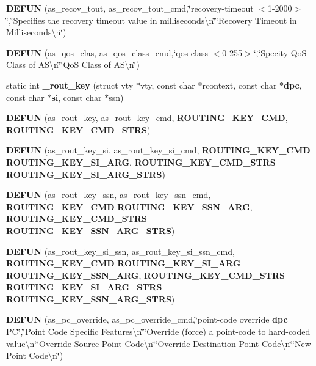 \begin{DoxyCompactItemize}
{\bf D\+E\+F\+UN} (as\+\_\+recov\+\_\+tout, as\+\_\+recov\+\_\+tout\+\_\+cmd,\char`\"{}recovery-\/timeout $<$1-\/2000$>$\char`\"{},\char`\"{}Specifies the recovery timeout value in milliseconds\textbackslash{}n\char`\"{}\char`\"{}Recovery Timeout in Milliseconds\textbackslash{}n\char`\"{})
\item 
{\bf D\+E\+F\+UN} (as\+\_\+qos\+\_\+clas, as\+\_\+qos\+\_\+class\+\_\+cmd,\char`\"{}qos-\/class $<$0-\/255$>$\char`\"{},\char`\"{}Specity QoS Class of A\+S\textbackslash{}n\char`\"{}\char`\"{}QoS Class of A\+S\textbackslash{}n\char`\"{})
\item 
static int {\bf \+\_\+rout\+\_\+key} (struct vty $\ast$vty, const char $\ast$rcontext, const char $\ast${\bf dpc}, const char $\ast${\bf si}, const char $\ast$ssn)
\item 
{\bf D\+E\+F\+UN} (as\+\_\+rout\+\_\+key, as\+\_\+rout\+\_\+key\+\_\+cmd, {\bf R\+O\+U\+T\+I\+N\+G\+\_\+\+K\+E\+Y\+\_\+\+C\+MD}, {\bf R\+O\+U\+T\+I\+N\+G\+\_\+\+K\+E\+Y\+\_\+\+C\+M\+D\+\_\+\+S\+T\+RS})
\item 
{\bf D\+E\+F\+UN} (as\+\_\+rout\+\_\+key\+\_\+si, as\+\_\+rout\+\_\+key\+\_\+si\+\_\+cmd, {\bf R\+O\+U\+T\+I\+N\+G\+\_\+\+K\+E\+Y\+\_\+\+C\+MD} {\bf R\+O\+U\+T\+I\+N\+G\+\_\+\+K\+E\+Y\+\_\+\+S\+I\+\_\+\+A\+RG}, {\bf R\+O\+U\+T\+I\+N\+G\+\_\+\+K\+E\+Y\+\_\+\+C\+M\+D\+\_\+\+S\+T\+RS} {\bf R\+O\+U\+T\+I\+N\+G\+\_\+\+K\+E\+Y\+\_\+\+S\+I\+\_\+\+A\+R\+G\+\_\+\+S\+T\+RS})
\item 
{\bf D\+E\+F\+UN} (as\+\_\+rout\+\_\+key\+\_\+ssn, as\+\_\+rout\+\_\+key\+\_\+ssn\+\_\+cmd, {\bf R\+O\+U\+T\+I\+N\+G\+\_\+\+K\+E\+Y\+\_\+\+C\+MD} {\bf R\+O\+U\+T\+I\+N\+G\+\_\+\+K\+E\+Y\+\_\+\+S\+S\+N\+\_\+\+A\+RG}, {\bf R\+O\+U\+T\+I\+N\+G\+\_\+\+K\+E\+Y\+\_\+\+C\+M\+D\+\_\+\+S\+T\+RS} {\bf R\+O\+U\+T\+I\+N\+G\+\_\+\+K\+E\+Y\+\_\+\+S\+S\+N\+\_\+\+A\+R\+G\+\_\+\+S\+T\+RS})
\item 
{\bf D\+E\+F\+UN} (as\+\_\+rout\+\_\+key\+\_\+si\+\_\+ssn, as\+\_\+rout\+\_\+key\+\_\+si\+\_\+ssn\+\_\+cmd, {\bf R\+O\+U\+T\+I\+N\+G\+\_\+\+K\+E\+Y\+\_\+\+C\+MD} {\bf R\+O\+U\+T\+I\+N\+G\+\_\+\+K\+E\+Y\+\_\+\+S\+I\+\_\+\+A\+RG} {\bf R\+O\+U\+T\+I\+N\+G\+\_\+\+K\+E\+Y\+\_\+\+S\+S\+N\+\_\+\+A\+RG}, {\bf R\+O\+U\+T\+I\+N\+G\+\_\+\+K\+E\+Y\+\_\+\+C\+M\+D\+\_\+\+S\+T\+RS} {\bf R\+O\+U\+T\+I\+N\+G\+\_\+\+K\+E\+Y\+\_\+\+S\+I\+\_\+\+A\+R\+G\+\_\+\+S\+T\+RS} {\bf R\+O\+U\+T\+I\+N\+G\+\_\+\+K\+E\+Y\+\_\+\+S\+S\+N\+\_\+\+A\+R\+G\+\_\+\+S\+T\+RS})
\item 
{\bf D\+E\+F\+UN} (as\+\_\+pc\+\_\+override, as\+\_\+pc\+\_\+override\+\_\+cmd,\char`\"{}point-\/code override {\bf dpc} PC\char`\"{},\char`\"{}Point Code Specific Features\textbackslash{}n\char`\"{}\char`\"{}Override (force) a point-\/code to hard-\/coded value\textbackslash{}n\char`\"{}\char`\"{}Override Source Point Code\textbackslash{}n\char`\"{}\char`\"{}Override Destination Point Code\textbackslash{}n\char`\"{}\char`\"{}New Point Code\textbackslash{}n\char`\"{})

\end{DoxyCompactItemize}
